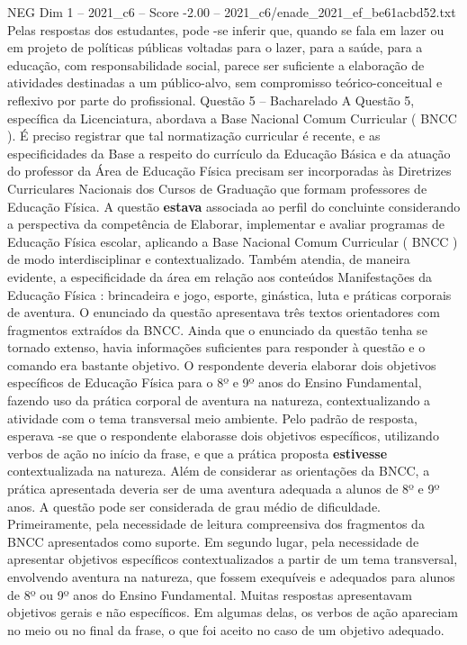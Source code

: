 \begin{textsample}{NEG Dim 1 – 2021\_c6 – Score -2.00 – 2021\_c6/enade\_2021\_ef\_be61acbd52.txt}
Pelas respostas dos estudantes, pode -se inferir que, quando se fala em lazer ou em projeto de políticas públicas voltadas para o lazer, para a saúde, para a educação, com responsabilidade social, parece ser suficiente a elaboração de atividades destinadas a um público-alvo, sem compromisso teórico-conceitual e reflexivo por parte do profissional.
Questão 5 – Bacharelado A Questão 5, específica da Licenciatura, abordava a Base Nacional Comum Curricular ( BNCC ).
É preciso registrar que tal normatização curricular é recente, e as especificidades da Base a respeito do currículo da Educação Básica e da atuação do professor da Área de Educação Física precisam ser incorporadas às Diretrizes Curriculares Nacionais dos Cursos de Graduação que formam professores de Educação Física.
A questão \textbf{estava} associada ao perfil do concluinte considerando a perspectiva da competência de Elaborar, implementar e avaliar programas de Educação Física escolar, aplicando a Base Nacional Comum Curricular ( BNCC ) de modo interdisciplinar e contextualizado.
Também atendia, de maneira evidente, a especificidade da área em relação aos conteúdos Manifestações da Educação Física : brincadeira e jogo, esporte, ginástica, luta e práticas corporais de aventura.
O enunciado da questão apresentava três textos orientadores com fragmentos extraídos da BNCC.
Ainda que o enunciado da questão tenha se tornado extenso, havia informações suficientes para responder à questão e o comando era bastante objetivo.
O respondente deveria elaborar dois objetivos específicos de Educação Física para o 8º e 9º anos do Ensino Fundamental, fazendo uso da prática corporal de aventura na natureza, contextualizando a atividade com o tema transversal meio ambiente.
Pelo padrão de resposta, esperava -se que o respondente elaborasse dois objetivos específicos, utilizando verbos de ação no início da frase, e que a prática proposta \textbf{estivesse} contextualizada na natureza.
Além de considerar as orientações da BNCC, a prática apresentada deveria ser de uma aventura adequada a alunos de 8º e 9º anos.
A questão pode ser considerada de grau médio de dificuldade.
Primeiramente, pela necessidade de leitura compreensiva dos fragmentos da BNCC apresentados como suporte.
Em segundo lugar, pela necessidade de apresentar objetivos específicos contextualizados a partir de um tema transversal, envolvendo aventura na natureza, que fossem exequíveis e adequados para alunos de 8º ou 9º anos do Ensino Fundamental.
Muitas respostas apresentavam objetivos gerais e não específicos.
Em algumas delas, os verbos de ação apareciam no meio ou no final da frase, o que foi aceito no caso de um objetivo adequado.

\end{textsample}
